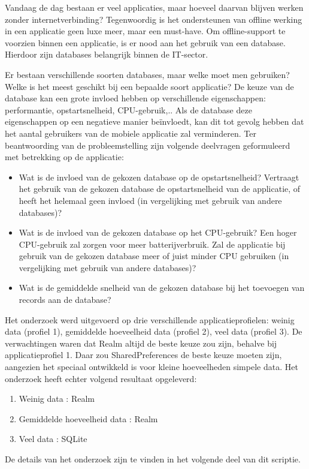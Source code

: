 \begin{displayquote}
  Vandaag de dag bestaan er veel applicaties, maar hoeveel daarvan blijven werken
  zonder internetverbinding? Tegenwoordig is het ondersteunen van offline werking in
  een applicatie geen luxe meer, maar een must-have. Om offline-support te voorzien
  binnen een applicatie, is er nood aan het gebruik van een database. Hierdoor zijn
  databases belangrijk binnen de IT-sector.
  
  Er bestaan verschillende soorten databases, maar welke moet men gebruiken?
  Welke is het meest geschikt bij een bepaalde soort applicatie? De keuze van de database
  kan een grote invloed hebben op verschillende eigenschappen: performantie,
  opstartsnelheid, CPU-gebruik,.. Als de database deze eigenschappen op een negatieve
  manier beïnvloedt, kan dit tot gevolg hebben dat het aantal gebruikers van de mobiele
  applicatie zal verminderen. Ter beantwoording van de probleemstelling zijn volgende
  deelvragen geformuleerd met betrekking op de applicatie:
  \begin{itemize}
    \item 	Wat is de invloed van de gekozen database op de opstartsnelheid? Vertraagt het
    gebruik van de gekozen database de opstartsnelheid van de applicatie, of heeft
    het helemaal geen invloed (in vergelijking met gebruik van andere databases)?
    \item Wat is de invloed van de gekozen database op het CPU-gebruik? Een hoger
    CPU-gebruik zal zorgen voor meer batterijverbruik. Zal de applicatie bij gebruik
    van de gekozen database meer of juist minder CPU gebruiken (in vergelijking
    met gebruik van andere databases)?
    \item  Wat is de gemiddelde snelheid van de gekozen database bij het toevoegen van
    records aan de database?
  \end{itemize}
  
  
  Het onderzoek werd uitgevoerd op drie verschillende applicatieprofielen: weinig data
  (profiel 1), gemiddelde hoeveelheid data (profiel 2), veel data (profiel 3).
  De verwachtingen waren dat Realm altijd de beste keuze zou zijn, behalve bij
  applicatieprofiel 1. Daar zou SharedPreferences de beste keuze moeten zijn, aangezien
  het speciaal ontwikkeld is voor kleine hoeveelheden simpele data. Het onderzoek heeft
  echter volgend resultaat opgeleverd:
  
  \begin{enumerate}
    \item Weinig data : Realm
    \item Gemiddelde hoeveelheid data : Realm
    \item Veel data : SQLite
  \end{enumerate}
  De details van het onderzoek zijn te vinden in het volgende deel van dit scriptie.
\end{displayquote}

